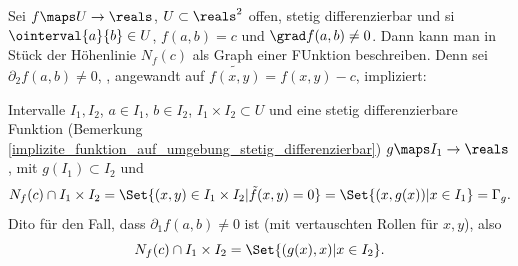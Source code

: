 \begin{folgerung*}
  Sei \( f\maps U\to \reals \), \( U\subset \reals^2 \) offen, stetig differenzierbar und si \( \ointerval{a}{b}\in U \), \( f(a,b)=c \) und \( \grad f(a,b)\neq 0 \). Dann kann man in Stück der Höhenlinie \( N_f(c) \) als Graph einer FUnktion beschreiben. Denn sei \( \partial_2 f(a,b)\neq 0 \), ,  angewandt auf \( \tilde{f(x,y)}=f(x,y)-c \), impliziert:

  \texists Intervalle \( I_1,I_2 \), \( a\in I_1 \), \( b\in I_2 \), \( I_1\times I_2\subset U \) und eine stetig differenzierbare Funktion (Bemerkung \ref{implizite_funktion_auf_umgebung_stetig_differenzierbar}) \( g\maps I_1\to \reals \), mit \( g(I_1)\subset I_2 \) und
  \begin{multline*}
    N_f(c)\cap I_1\times I_2=\Set{(x,y)\in I_1\times I_2|\tilde{f}(x,y)=0}=\Set{(x,g(x))|x\in I_1}=\Gamma_g.
  \end{multline*}
  Dito für den Fall, dass \( \partial_1 f(a,b)\neq 0 \) ist (mit vertauschten Rollen für \( x, y \)), also
  \begin{equation*}
    N_f(c)\cap I_1\times I_2=\Set{(g(x),x)|x\in I_2}.
  \end{equation*}
\end{folgerung*}
